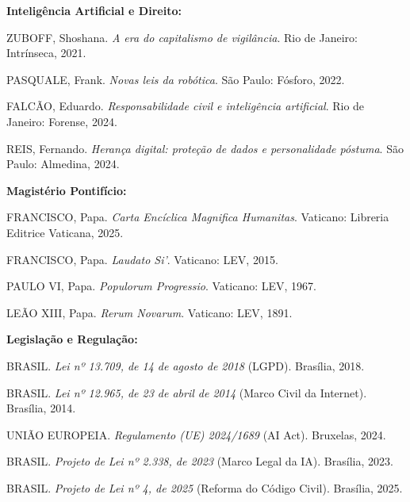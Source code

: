 \documentclass[12pt,a4paper]{article}
\begin{document}
\textbf{Inteligência Artificial e Direito:}

ZUBOFF, Shoshana. \textit{A era do capitalismo de vigilância}. Rio de Janeiro: Intrínseca, 2021.

PASQUALE, Frank. \textit{Novas leis da robótica}. São Paulo: Fósforo, 2022.

FALCÃO, Eduardo. \textit{Responsabilidade civil e inteligência artificial}. Rio de Janeiro: Forense, 2024.

REIS, Fernando. \textit{Herança digital: proteção de dados e personalidade póstuma}. São Paulo: Almedina, 2024.

\textbf{Magistério Pontifício:}

FRANCISCO, Papa. \textit{Carta Encíclica Magnifica Humanitas}. Vaticano: Libreria Editrice Vaticana, 2025.

FRANCISCO, Papa. \textit{Laudato Si'}. Vaticano: LEV, 2015.

PAULO VI, Papa. \textit{Populorum Progressio}. Vaticano: LEV, 1967.

LEÃO XIII, Papa. \textit{Rerum Novarum}. Vaticano: LEV, 1891.

\textbf{Legislação e Regulação:}

BRASIL. \textit{Lei nº 13.709, de 14 de agosto de 2018} (LGPD). Brasília, 2018.

BRASIL. \textit{Lei nº 12.965, de 23 de abril de 2014} (Marco Civil da Internet). Brasília, 2014.

UNIÃO EUROPEIA. \textit{Regulamento (UE) 2024/1689} (AI Act). Bruxelas, 2024.

BRASIL. \textit{Projeto de Lei nº 2.338, de 2023} (Marco Legal da IA). Brasília, 2023.

BRASIL. \textit{Projeto de Lei nº 4, de 2025} (Reforma do Código Civil). Brasília, 2025.
\end{document}
